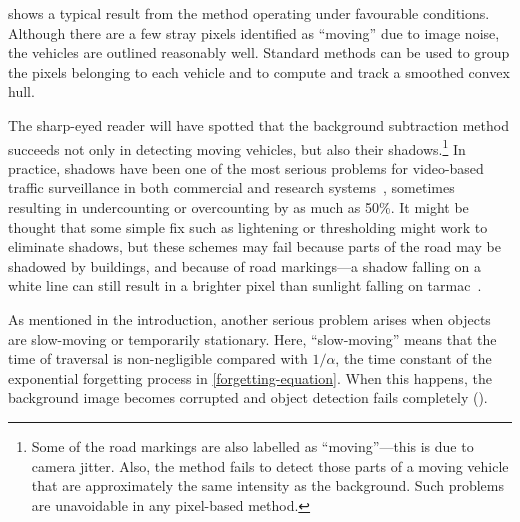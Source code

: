  shows a typical result from the method
operating under favourable conditions. Although there are a few stray
pixels identified as ``moving'' due to image noise, the vehicles are
outlined reasonably well. Standard methods can be used to group the
pixels belonging to each vehicle and to compute and track a smoothed
convex hull.

The sharp-eyed reader will have spotted that the background
subtraction method succeeds not only in detecting moving vehicles, but
also their shadows.\footnote{Some of the road markings are also
labelled as ``moving''---this is due to camera jitter.
Also, the method fails to detect those parts of a moving vehicle that
are approximately the same intensity as the background.
Such problems are unavoidable in any pixel-based method.}
In practice, shadows have been one of the most
serious problems for video-based traffic surveillance in both
commercial and research systems~\cite{Michalopoulos:1991}, sometimes
resulting in undercounting or overcounting by as much as 50\%.  It
might be thought that some simple fix such as lightening or
thresholding might work to eliminate shadows, but these schemes may fail
because parts of the road may be shadowed by buildings, and because of
road markings---a shadow falling on a white line can still result in a
brighter pixel than sunlight falling on tarmac~\cite{Kilger:1992}.

As mentioned in the introduction, another serious problem arises when
objects are slow-moving or temporarily stationary. Here, ``slow-moving''
means that the time of
traversal is non-negligible compared with $1/\alpha$,
the time constant of the exponential forgetting process in
\eqref{forgetting-equation}. When this happens,
the background image becomes corrupted and object detection fails
completely ().

